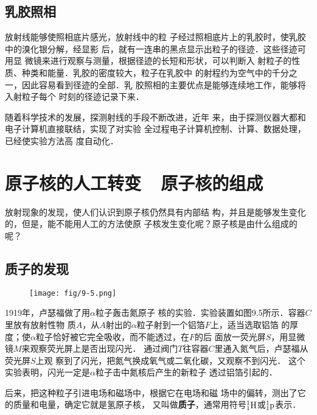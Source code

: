 \subsection{乳胶照相}

放射线能够使照相底片感光，放射线中的粒
子经过照相底片上的乳胶时，使乳胶中的溴化银分解，经显影
后，就有一连串的黑点显示出粒子的径迹．这些径迹可用显
微镜来进行观察与测量，根据径迹的长短和形状，可以判断入
射粒子的性质、种类和能量．乳胶的密度较大，粒子在乳胶中
的射程约为空气中的千分之一，因此容易看到径迹的全部．乳
胶照相的主要优点是能够连续地工作，能够将入射粒子每个
时刻的径迹记录下来．

随着科学技术的发展，探测射线的手段不断改进，近年
来，由于探测仪器大都和电子计算机直接联结，实现了对实验
全过程电子计算机控制、计算、数据处理，已经使实验方法高
度自动化．

\section{原子核的人工转变~~原子核的组成}
放射现象的发现，使人们认识到原子核仍然具有内部结
构，并且是能够发生变化的，但是，能不能用人工的方法使原
子核发生变化呢？原子核是由什么组成的呢？

\subsection{质子的发现}
\begin{figure}[htp]\centering
\texttt{[image: fig/9-5.png]}
\caption{}
\end{figure}

1919年，卢瑟福做了用$\alpha$粒子轰击氮原子
核的实验．实验装置如图9.5所示．容器$C$里放有放射性物
质$A$，从$A$射出的$\alpha$粒子射到一个铝箔$F$上，适当选取铝箔
的厚度；使$\alpha$粒子恰好被它完全吸收，而不能透过，在$F$的后
面放一荧光屏$S$，用显微镜$M$来观察荧光屏上是否出现闪光．
通过阀门$T$往容器$C$里通入氮气后，卢瑟福从荧光屏$S$上观
察到了闪光，把氮气换成氧气或二氧化碳，又观察不到闪光．
这个实验表明，闪光一定是$\alpha$粒子击中氮核后产生的新粒子
透过铝箔引起的．

后来，把这种粒子引进电场和磁场中，根据它在电场和磁
场中的偏转，测出了它的质量和电量，确定它就是氢原子核，
又叫做\textbf{质子}，通常用符号$\atom{H}{1}{1}$或$\atom{p}{1}{1}$表示．
\begin{figure}[htp]\centering
{}\qquad\qquad {}
\caption{}
\end{figure}

